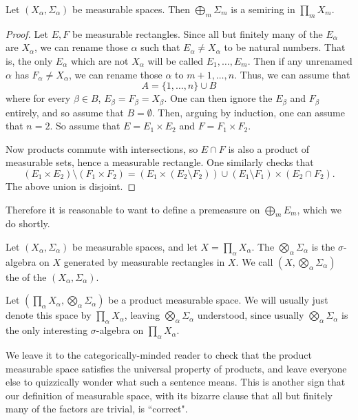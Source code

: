 \begin{lemma}
Let $(X_\alpha, \Sigma_\alpha)$ be measurable spaces.
Then $\bigoplus_m \Sigma_m$ is a semiring in $\prod_m X_m$.
\end{lemma}
\begin{proof}
Let $E, F$ be measurable rectangles.
Since all but finitely many of the $E_\alpha$ are $X_\alpha$, we can rename those $\alpha$ such that $E_\alpha \neq X_\alpha$ to be natural numbers.
That is, the only $E_\alpha$ which are not $X_\alpha$ will be called $E_1, \dots, E_m$.
Then if any unrenamed $\alpha$ has $F_\alpha \neq X_\alpha$, we can rename those $\alpha$ to $m+1, \dots, n$.
Thus, we can assume that
$$A = \{1, \dots, n\} \cup B$$
where for every $\beta \in B$, $E_\beta = F_\beta = X_\beta$.
One can then ignore the $E_\beta$ and $F_\beta$ entirely, and so assume that $B = \emptyset$.
Then, arguing by induction, one can assume that $n = 2$.
So assume that $E = E_1 \times E_2$ and $F = F_1 \times F_2$.

Now products commute with intersections, so $E \cap F$ is also a product of measurable sets, hence a measurable rectangle.
One similarly checks that
$$(E_1 \times E_2) \setminus (F_1 \times F_2) = (E_1 \times (E_2 \setminus F_2)) \cup (E_1 \setminus F_1) \times (E_2 \cap F_2).$$
The above union is disjoint.
\end{proof}

Therefore it is reasonable to want to define a premeasure on $\bigoplus_m E_m$, which we do shortly.

\begin{definition}
Let $(X_\alpha, \Sigma_\alpha)$ be measurable spaces, and let $X = \prod_\alpha X_\alpha$.
The  $\bigotimes_\alpha \Sigma_\alpha$ is the $\sigma$-algebra on $X$ generated by measurable rectangles in $X$.
We call $(X, \bigotimes_\alpha \Sigma_\alpha)$ the  of the $(X_\alpha, \Sigma_\alpha)$.
\end{definition}

Let $(\prod_\alpha X_\alpha, \bigotimes_\alpha \Sigma_\alpha)$ be a product measurable space. We will usually just denote this space by $\prod_\alpha X_\alpha$, leaving $\bigotimes_\alpha \Sigma_\alpha$ understood, since usually $\bigotimes_\alpha \Sigma_\alpha$ is the only interesting $\sigma$-algebra on $\prod_\alpha X_\alpha$.

We leave it to the categorically-minded reader to check that the product measurable space satisfies the universal property of products, and leave everyone else to quizzically wonder what such a sentence means.
This is another sign that our definition of measurable space, with its bizarre clause that all but finitely many of the factors are trivial, is ``correct".

